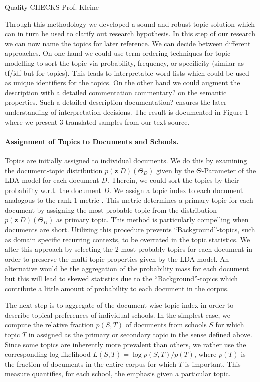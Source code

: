 \documentclass[a4paper,10pt]{article}
\newcommand{\TODO}[1]{\begingroup\color{red}#1\endgroup}
\newcommand{\PFS}[1]{\begingroup\color{blue}#1\endgroup}
\newcommand{\NR}[1]{\begingroup\color{orange}#1\endgroup}
\begin{document}
Quality CHECKS Prof. Kleine

Through this methodology we developed a sound and robust topic solution
which can in turn be used to clarify out research hypothesis.
In this step of our research we can now name
the topics for later reference. We can decide between different approaches. On one hand 
we could use term ordering techniques for topic modelling to sort the topic via 
probability, frequency, or specificity (similar as tf/idf but for topics). This leads to 
interpretable word lists which could be used as unique identifiers for the topics. On
the other hand we could augment the description with a detailed commentation \NR{commentary?} on the 
semantic properties. Such a detailed description \NR{documentation?} ensures the later understanding of 
interpretation decisions. The result is documented in \TODO{Figure 1} where we present 3 
translated samples from our text source.


\paragraph{Assignment of Topics to Documents and Schools.} 

\PFS{Topics are initially assigned to individual documents.} We do this by examining  the document-topic distribution $p(\mathbf{z}|D) (\Theta_D)$ given by the $\Theta$-Parameter of the LDA model for each document $D$. Therein, we could sort the topics by their probability w.r.t. the document $D$. We assign a topic index to each document analogous to the rank-1 metric \cite{evans:2014}. This metric determines a primary topic for each document by assigning  the most probable topic from the distribution $p(\mathbf{z}|D) (\Theta_D)$ as primary topic.  This method is particularly compelling when documents are short. Utilizing this procedure prevents "`Background"'-topics, such as domain specific recurring contexts, to be overrated in the topic statistics. We alter this approach by selecting the 2 most probably topics for each document in order to preserve the  \NR{multi-topic-properties} given by the LDA model. An alternative would be the aggregation of the probability mass for each document but this will lead to skewed statistics due to the "`Background"'-topics which contribute a little amount of probability to each document in the corpus.

The next step is to aggregate of the document-wise topic index in order to
describe topical preferences of individual schools.  In the simplest case,
we compute the relative fraction $p(S,T)$ of documents from schools $S$ for
which topic $T$ in assigned as the primary or secondary topic in the sense defined above.  Since
some topics are inherently more prevalent than others, we rather use the
corresponding log-likelihood $L(S,T) = \log p(S,T)/p(T)$, where $p(T)$ is
the fraction of documents in the entire corpus for which $T$ is
important. This measure quantifies, for each school, the emphasis
given a particular topic.
\end{document}
